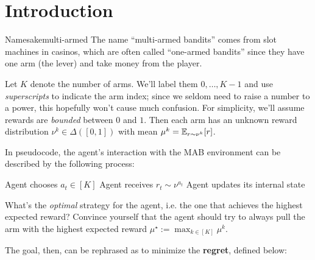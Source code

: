 \documentclass[\main/main]{subfiles}
\begin{document}
\section{Introduction}

\begin{remark}{Namesake}{multi-armed}
    The name ``multi-armed bandits'' comes from slot machines in casinos, which are often called ``one-armed bandits'' since they have one arm (the lever) and take money from the player.
\end{remark}

Let $K$ denote the number of arms. We'll label them $0, \dots, K-1$ and use \emph{superscripts} to indicate the arm index; since we seldom need to raise a number to a power, this hopefully won't cause much confusion. For simplicity, we'll assume rewards are \emph{bounded} between $0$ and $1$. Then each arm has an unknown reward distribution $\nu^k \in \Delta([0, 1])$ with mean $\mu^k = \operatorname*{\mathbb{E}}_{r \sim \nu^k} [r]$.

In pseudocode, the agent's interaction with the MAB environment can be described by the following process:

\begin{algorithmic}
    \State Agent chooses $a_t \in [K]$
    \State Agent receives $r_t \sim \nu^{a_t}$
    \State Agent updates its internal state
\EndFor
\end{algorithmic}

What's the \emph{optimal} strategy for the agent, i.e. the one that achieves the highest expected reward? Convince yourself that the agent should try to always pull the arm with the highest expected reward $\mu^\star := \max_{k \in [K]} \mu^k$.

The goal, then, can be rephrased as to minimize the \textbf{regret}, defined below:
\end{document}
